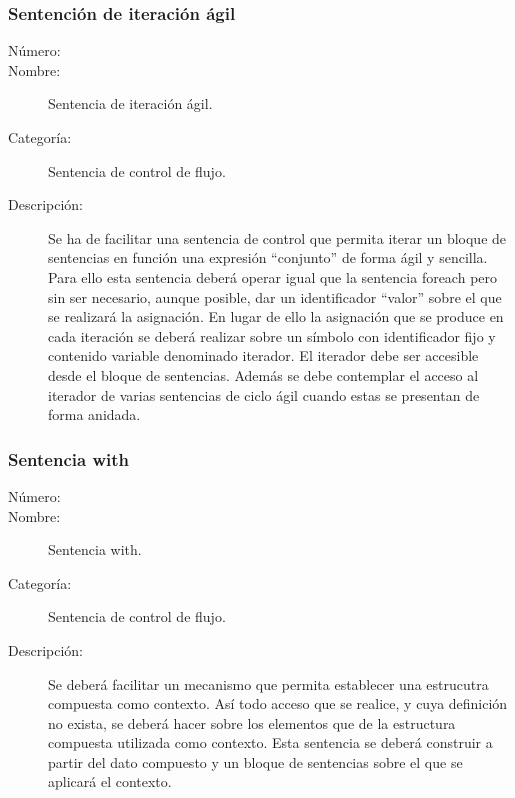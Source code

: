 \subsubsection{Sentención de iteración ágil}
\begin{framed}
	\begin{description}
		\item [Número:] \cn
		\item [Nombre:] Sentencia de iteración ágil.
		\item [Categoría:] Sentencia de control de flujo.
		\item [Descripción:] Se ha de facilitar una sentencia de control que permita
		iterar un bloque de sentencias en función una expresión ``conjunto'' de forma ágil y sencilla.
		Para ello esta sentencia deberá operar igual que la sentencia foreach pero sin ser necesario, aunque posible,
		dar un identificador ``valor'' sobre el que se realizará la asignación. En lugar de ello la asignación que se produce
		en cada iteración se deberá realizar sobre un símbolo con identificador fijo y contenido variable denominado iterador.
		El iterador debe ser accesible desde el bloque de sentencias. Además se debe contemplar el acceso al iterador de 
      varias sentencias de ciclo ágil cuando estas se presentan de forma anidada. 
	\end {description}
\end{framed}

\subsubsection{Sentencia with}
\begin{framed}
	\begin{description}
		\item [Número:] \cn
		\item [Nombre:] Sentencia with.
		\item [Categoría:] Sentencia de control de flujo.
		\item [Descripción:] Se deberá facilitar un mecanismo que permita establecer una estrucutra compuesta como contexto. Así todo acceso que se
      realice, y cuya definición no exista, se deberá hacer sobre los elementos que de la estructura compuesta utilizada como contexto. 
      Esta sentencia se deberá construir a partir del dato compuesto y un bloque de sentencias sobre el que se aplicará el contexto.
	\end{description}
\end{framed}

